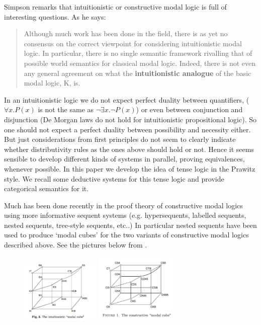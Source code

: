\documentclass{article}
\begin{document}
Simpson remarks that intuitionistic or constructive modal logic is full of interesting questions. As he says:
\begin{quote}
Although much work has been done in the field, there is as yet no consensus on the correct viewpoint for considering intuitionistic modal logic.  In particular, there is no single semantic framework rivalling that of possible world semantics for classical modal logic. Indeed, there is not even any general agreement on what the \textbf{intuitionistic analogue} of the basic modal logic, K, is.
\end{quote}
In an intuitionistic logic we do not expect perfect duality between quantifiers, ($\forall x.P(x)$ is not the same as $\neg \exists x.\neg
P(x)$) or even between conjunction and disjunction (De Morgan laws do not hold for intuitionistic propositional logic). So one should not expect a perfect duality between possibility and necessity either. But just considerations from first principles do not seem to clearly indicate whether distributivity rules as the ones above should hold or not. Hence it seems sensible to develop different kinds of systems in parallel, proving equivalences, whenever possible. In this paper we develop the idea of tense logic in the Prawitz style. We recall some deductive systems for this tense logic and provide categorical semantics for it.


Much has been done recently in the proof theory of constructive modal logics using more informative sequent systems (e.g. hypersequents, labelled sequents, nested sequents, tree-style sequents, etc..) In particular nested sequents have been used to produce `modal cubes' for the two variants of constructive modal logics described above. See the pictures below from \cite{arisaka2015,strasburger2013}.

\begin{figure}[h!]
\centering
\includegraphics[width=1.5in]{intmodalcube.pdf}
\includegraphics[width=1.6in]{constructivemodalcube.pdf}
\label{fig:modalcube}
\end{figure}
\end{document}
